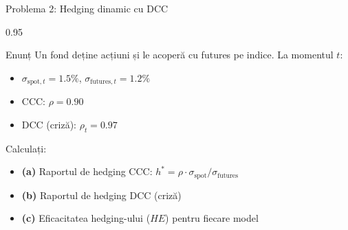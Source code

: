 \documentclass[9pt, aspectratio=169, t]{beamer}
\begin{document}
\begin{frame}{Problema 2: Hedging dinamic cu DCC}
    \begin{cminipage}{0.95\textwidth}
    \begin{block}{Enunț}
        Un fond deține acțiuni și le acoperă cu futures pe indice. La momentul $t$:
        \begin{itemize}\setlength{\itemsep}{0pt}
            \item $\sigma_{\text{spot},t} = 1.5\%$, $\sigma_{\text{futures},t} = 1.2\%$
            \item CCC: $\rho = 0.90$
            \item DCC (criză): $\rho_t = 0.97$
        \end{itemize}

        \vspace{0.3cm}
        Calculați:
        \begin{itemize}\setlength{\itemsep}{0pt}
            \item \textbf{(a)} Raportul de hedging CCC: $h^* = \rho \cdot \sigma_{\text{spot}} / \sigma_{\text{futures}}$
            \item \textbf{(b)} Raportul de hedging DCC (criză)
            \item \textbf{(c)} Eficacitatea hedging-ului ($HE$) pentru fiecare model
        \end{itemize}
    \end{block}
    \end{cminipage}
\end{frame}
\end{document}

